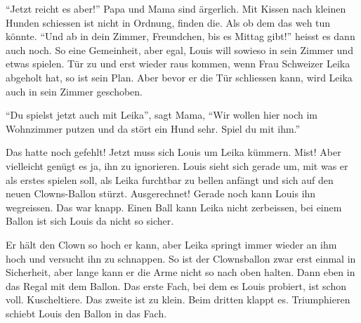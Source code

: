 \enquote{Jetzt reicht es aber!} Papa und Mama sind ärgerlich. Mit Kissen nach kleinen Hunden schiessen ist nicht in Ordnung, finden die. Als ob dem das weh tun könnte.
\enquote{Und ab in dein Zimmer, Freundchen, bis es Mittag gibt!} heisst es dann auch noch. So eine Gemeinheit, aber egal, Louis will sowieso in sein Zimmer und etwas spielen. Tür zu und erst wieder raus kommen, wenn Frau Schweizer Leika abgeholt hat, so ist sein Plan. Aber bevor er die Tür schliessen kann, wird Leika auch in sein Zimmer geschoben. 

\enquote{Du spielst jetzt auch mit Leika}, sagt Mama, \enquote{Wir wollen hier noch im Wohnzimmer putzen und da stört ein Hund sehr. Spiel du mit ihm.}

Das hatte noch gefehlt! Jetzt muss sich Louis um Leika kümmern. Mist! Aber vielleicht genügt es ja, ihn zu ignorieren. Louis sieht sich gerade um, mit was er als erstes spielen soll, als Leika furchtbar zu bellen anfängt und sich auf den neuen Clowns-Ballon stürzt. Ausgerechnet! Gerade noch kann Louis ihn wegreissen. Das war knapp. Einen Ball kann Leika nicht zerbeissen, bei einem Ballon ist sich Louis da nicht so sicher.

Er hält den Clown so hoch er kann, aber Leika springt immer wieder an ihm hoch und versucht ihn zu schnappen. So ist der Clownsballon zwar erst einmal in Sicherheit, aber lange kann er die Arme nicht so nach oben halten. Dann eben in das Regal mit dem Ballon. Das erste Fach, bei dem es Louis probiert, ist schon voll. Kuscheltiere. Das zweite ist zu klein. Beim dritten klappt es. Triumphieren schiebt Louis den Ballon in das Fach.

